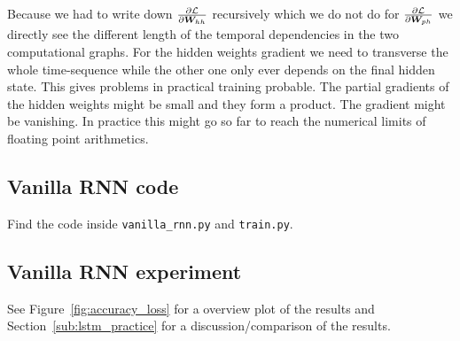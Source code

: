 \documentclass{article}
\begin{document}
Because we had to write down \(\pf{\L}{\B{W}_{hh}}\) recursively which we do not do for \(\pf{\L}{\B{W}_{ph}}\) we directly see the different length of the temporal dependencies in the two computational graphs.
For the hidden weights gradient we need to transverse the whole time-sequence while the other one only ever depends on the final hidden state.
This gives problems in practical training probable.
The partial gradients of the hidden weights might be small and they form a product.
The gradient might be vanishing.
In practice this might go so far to reach the numerical limits of floating point arithmetics.

\subsection{Vanilla RNN code}
Find the code inside \texttt{vanilla\_rnn.py} and \texttt{train.py}.

\subsection{Vanilla RNN experiment}
See Figure~\ref{fig:accuracy_loss} for a overview plot of the results and Section~\ref{sub:lstm_practice} for a discussion/comparison of the results.
\end{document}
